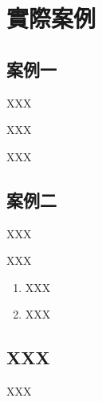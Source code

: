 \chapter{實際案例}
\renewcommand{\baselinestretch}{10} %
\section{案例一}
\par
\renewcommand{\baselinestretch}{1} %
\twelve XXX\\
\par
\renewcommand{\baselinestretch}{1} %
\twelve XXX\\
\par
\renewcommand{\baselinestretch}{1} %
\twelve XXX
\par

\renewcommand{\baselinestretch}{20} %
\section{案例二}
\par
\renewcommand{\baselinestretch}{1} %
\twelve XXX\\
\par
\renewcommand{\baselinestretch}{1} %
\twelve XXX
\begin{enumerate}
	\item XXX
	\item XXX
\end{enumerate}
\par

\renewcommand{\baselinestretch}{20} %
\section{XXX}
\par
\renewcommand{\baselinestretch}{1} %
\twelve XXX
\par
